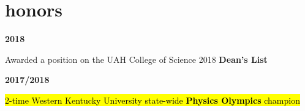 \documentclass[9pt]{article}
\newcommand{\entry}[2]{
	\begin{minipage}[c]{.14\textwidth}
		{\small\textbf{#1}}\hfill
	\end{minipage}
	{\color{OliveGreen}\hfill \vline \hfill}
	\begin{minipage}[c]{.8\textwidth}
		#2
	\end{minipage}\vspace{.12in}
	}
\begin{document}
\section{honors}
\textit{}

	\entry{2018}{Awarded a position on the UAH College of Science 2018 \textbf{Dean's List}}


	\entry{2017/2018}{\hl{2-time Western Kentucky University state-wide \textbf{Physics Olympics} champion}}
\end{document}
